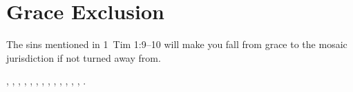 \section{Grace Exclusion}

The sins mentioned in 1~Tim 1:9--10 will make you fall from grace to the mosaic jurisdiction if not turned away from.

, 
, 
, 
, 
, 
, 
, 
, 
,
, 
, 
, 
, 
.
